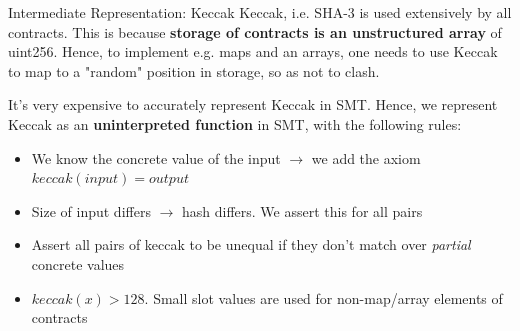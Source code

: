 \documentclass[aspectratio=169]{beamer}
\begin{document}
 \begin{frame}[fragile=singleslide]{Intermediate Representation: Keccak}
 Keccak, i.e. SHA-3 is used extensively by all contracts. This is because \textbf{storage of contracts is an unstructured array} of uint256. Hence, to implement e.g. maps and an arrays, one needs to use Keccak to map to a "random" position in storage, so as not to clash.
 \bigskip

 It's very expensive to accurately represent Keccak in SMT. Hence, we represent Keccak as an \textbf{uninterpreted function} in SMT, with the following rules:
 \begin{itemize}
 \item We know the concrete value of the input $\rightarrow$ we add the axiom $keccak(input)=output$
 \item Size of input differs $\rightarrow$ hash differs. We assert this for all pairs
 \item Assert all pairs of keccak to be unequal if they don't match over \emph{partial} concrete values
 \item $keccak(x) > 128$. Small slot values are used for non-map/array elements of contracts
 \end{itemize}
 \end{frame}



\end{document}
